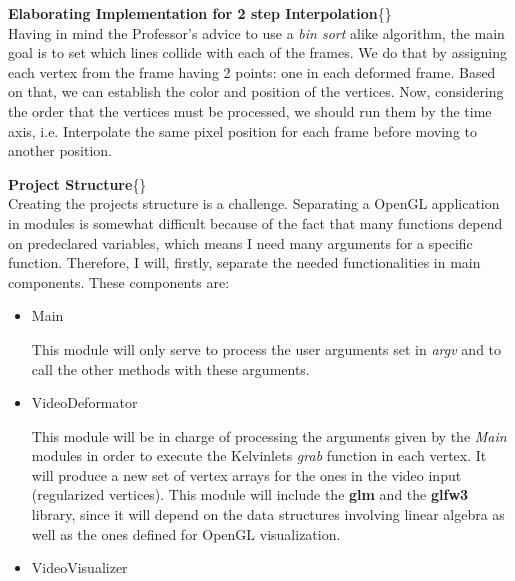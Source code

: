 \documentclass[12pt, a4paper]{report}
\newenvironment{loggentry}[2]%
{\noindent\textbf{#2}\newline\{\marginnote{#1}\}\newline\\}{\vspace{1.0cm}}
\begin{document}
\begin{loggentry}{30-05-2019}{Elaborating Implementation for 2 step Interpolation}
		Having in mind the Professor's advice to use a \textit{bin sort} alike algorithm, the main goal is to set which lines collide with each of the frames. We do that by assigning each vertex from the frame having 2 points: one in each deformed frame. Based on that, we can establish the color and position of the vertices. Now, considering the order that the vertices must be processed, we should run them by the time axis, i.e. Interpolate the same pixel position for each frame before moving to another position.    
\end{loggentry}

\begin{loggentry}{(01 - 03)-06-2019}{Project Structure}
	Creating the projects structure is a challenge. Separating a OpenGL application in modules is somewhat difficult because of the fact that many functions depend on predeclared variables, which means I need many arguments for a specific function. Therefore, I will, firstly, separate the needed functionalities in main components. These components are:
				\begin{itemize}
								\item Main
												
											This module will only serve to process the user arguments set in \textit{argv} and to call the other methods with these arguments.
								\item VideoDeformator
									
												This module will be in charge of processing the arguments given by the \textit{Main} modules in order to execute the Kelvinlets \textit{grab} function in each vertex. It will produce a new set of vertex arrays for the ones in the video input (regularized vertices). This module will include the \textbf{glm} and the \textbf{glfw3} library, since it will depend on the data structures involving linear algebra as well as the ones defined for OpenGL visualization. 	
								\item VideoVisualizer
				\end{itemize}
\end{loggentry}
\end{document}
